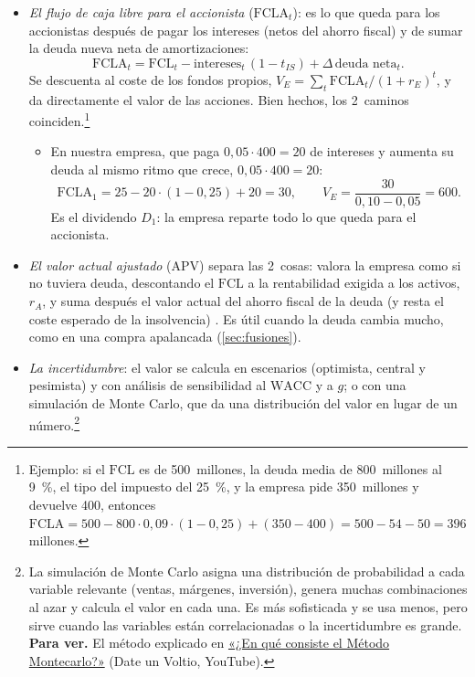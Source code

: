 \documentclass[11pt]{article}
\begin{document}
\begin{itemize}
\item \emph{El flujo de caja libre para el accionista} ($\mathrm{FCLA}_t$): es lo que queda para los accionistas después de pagar los intereses (netos del ahorro fiscal) y de sumar la deuda nueva neta de amortizaciones:
  \begin{equation}\label{eq:fcla}
  \mathrm{FCLA}_t=\mathrm{FCL}_t-\text{intereses}_t\,(1-t_{IS})+\Delta\,\text{deuda neta}_t.
  \end{equation}
  Se descuenta al coste de los fondos propios, $V_E=\sum_t\mathrm{FCLA}_t/(1+r_E)^t$, y da directamente el valor de las acciones. Bien hechos, los 2~caminos coinciden.\footnote{Ejemplo: si el $\mathrm{FCL}$ es de 500~millones, la deuda media de 800~millones al 9~\%, el tipo del impuesto del 25~\%, y la empresa pide 350~millones y devuelve 400, entonces $\mathrm{FCLA}=500-800\cdot0{,}09\cdot(1-0{,}25)+(350-400)=500-54-50=396$ millones.}
  \begin{itemize}
  \item En nuestra empresa, que paga $0{,}05\cdot400=20$ de intereses y aumenta su deuda al mismo ritmo que crece, $0{,}05\cdot400=20$:
  \[
  \mathrm{FCLA}_1=25-20\cdot(1-0{,}25)+20=30,\qquad V_E=\frac{30}{0{,}10-0{,}05}=600.
  \]
  Es el dividendo $D_1$: la empresa reparte todo lo que queda para el accionista.
  \end{itemize}
\item \emph{El valor actual ajustado} (APV) separa las 2~cosas: valora la empresa como si no tuviera deuda, descontando el $\mathrm{FCL}$ a la rentabilidad exigida a los activos, $r_A$, y suma después el valor actual del ahorro fiscal de la deuda (y resta el coste esperado de la insolvencia)\nocite{Myers1974Interactions} . Es útil cuando la deuda cambia mucho, como en una compra apalancada (\ref{sec:fusiones}).
\item \emph{La incertidumbre}: el valor se calcula en escenarios (optimista, central y pesimista) y con análisis de sensibilidad al $\mathrm{WACC}$ y a $g$; o con una simulación de Monte Carlo, que da una distribución del valor en lugar de un número.\footnote{La simulación de Monte Carlo asigna una distribución de probabilidad a cada variable relevante (ventas, márgenes, inversión), genera muchas combinaciones al azar y calcula el valor en cada una. Es más sofisticada y se usa menos, pero sirve cuando las variables están correlacionadas o la incertidumbre es grande. \textbf{Para ver.} El método explicado en \href{https://www.youtube.com/watch?v=WJjDr67frtM}{«¿En qué consiste el Método Montecarlo?»} (Date un Voltio, YouTube).}
\end{itemize}
\end{document}
